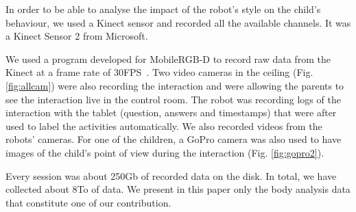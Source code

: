 In order to be able to analyse the impact of the robot's style on the child's behaviour, we used a Kinect sensor and recorded all the available channels.
It was a Kinect Sensor 2 from Microsoft.

We used a program developed for MobileRGB-D to record raw data from the Kinect at a frame rate of 30FPS~\cite{MobileRGB}.
Two video cameras in the ceiling (Fig. \ref{fig:allcam})  were also recording the interaction and were allowing the parents to see the interaction live in the control room.
The robot was recording logs of the interaction with the tablet (question, answers and timestamps) that were after used to label the activities  automatically.
We also recorded videos from the robots' cameras.
For one of the children, a GoPro camera was also used to have images of the child's point of view during the interaction (Fig. \ref{fig:gopro2}).



%
%


Every session was about 250Gb of recorded data on the disk.
In total, we have collected about 8To of data.
We present in this paper only the body analysis data that constitute one of our contribution.


